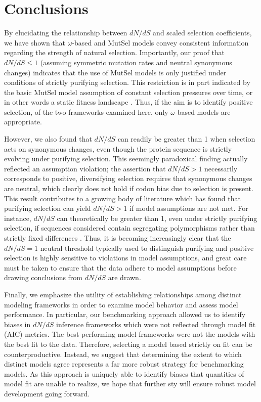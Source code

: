 \documentclass[11pt]{article}
\begin{document}
\section*{Conclusions}
By elucidating the relationship between $dN/dS$ and scaled selection coefficients, we have shown that $\omega$-based and MutSel models convey consistent information regarding the strength of natural selection. Importantly, our proof that $dN/dS \leq 1$ (assuming symmetric mutation rates and neutral synonymous changes) indicates that the use of MutSel models is only justified under conditions of strictly purifying selection. This restriction is in part indicated by the basic MutSel model assumption of constant selection pressures over time, or in other words a static fitness landscape \cite{HalpernBruno1998,Thorneetal2007,Rodrigueetal2010,Thorne2012}. Thus, if the aim is to identify positive selection, of the two frameworks examined here, only $\omega$-based models are appropriate. 

However, we also found that $dN/dS$ can readily be greater than 1 when selection acts on synonymous changes, even though the protein sequence is strictly evolving under purifying selection. This seemingly paradoxical finding actually reflected an assumption violation; the assertion that $dN/dS > 1$ necessarily corresponds to positive, diversifying selection requires that synonymous changes are neutral, which clearly does not hold if codon bias due to selection is present. This result contributes to a growing body of literature which has found that purifying selection can yield $dN/dS > 1$ if model assumptions are not met. For instance, $dN/dS$ can theoretically be greater than 1, even under strictly purifying selection, if sequences considered contain segregating polymorphisms rather than strictly fixed differences \cite{Rochaetal2006,KryazhimskiyPlotkin2008,Mugaletal2014}. Thus, it is becoming increasingly clear that the $dN/dS = 1$ neutral threshold typically used to distinguish purifying and positive selection is highly sensitive to violations in model assumptions, and great care must be taken to ensure that the data adhere to model assumptions before drawing conclusions from $dN/dS$ are drawn.

Finally, we emphasize the utility of establishing relationships among distinct modeling frameworks in order to examine model behavior and assess model performance. In particular, our benchmarking approach allowed us to identify biases in $dN/dS$ inference frameworks which were not reflected through model fit (AIC) metrics. The best-performing model frameworks were not the models with the best fit to the data. Therefore, selecting a model based strictly on fit can be counterproductive. Instead, we suggest that determining the extent to which distinct models agree represents a far more robust strategy for benchmarking models. As this approach is uniquely able to identify biases that quantities of model fit are unable to realize, we hope that further sty will ensure robust model development going forward.
\end{document}
